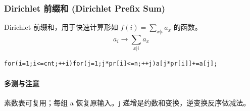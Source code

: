 \subsubsection{Dirichlet 前缀和 (Dirichlet Prefix Sum)}
Dirichlet 前缀和，用于快速计算形如 $f(i) = \sum_{x|i}a_x$ 的函数。
$$ a_i \to \sum_{x|i}a_x $$
\begin{lstlisting}
for(i=1;i<=cnt;++i)for(j=1;j*pr[i]<=n;++j)a[j*pr[i]]+=a[j];
\end{lstlisting}

\paragraph{多测与注意} 素数表可复用；每组 a 恢复原输入。j 递增是约数和变换，逆变换反序做减法。
